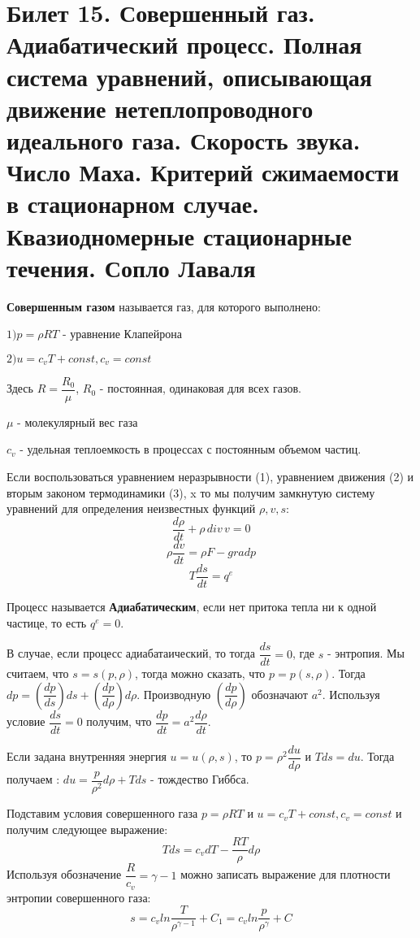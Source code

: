 \newpage
\section{Билет 15. Совершенный газ. Адиабатический процесс. Полная система уравнений, описывающая движение нетеплопроводного идеального газа. Скорость звука. Число Маха. Критерий сжимаемости в стационарном случае. Квазиодномерные стационарные течения. Сопло Лаваля}
	

\textbf{Совершенным газом} называется газ, для которого выполнено:

$1) p = \rho R T$ - уравнение Клапейрона

$2) u = c_v T + const, c_v = const$

Здесь $R = \dfrac{R_0}{\mu}$, $R_0$ - постоянная, одинаковая для всех газов.

$\mu$ - молекулярный вес газа

$c_v$ - удельная теплоемкость в процессах с постоянным объемом частиц.

Если воспользоваться уравнением неразрывности (1), уравнением движения (2) и вторым законом термодинамики (3), 
x   то мы получим замкнутую систему уравнений для определения неизвестных функций $\rho, v, s$:
$$\dfrac{d \rho}{d t} + \rho \,div\, v = 0 $$
  $$  \rho \dfrac{d v}{d t} = \rho F - grad p $$
   $$ T \dfrac{d s}{d t} = q^{e}$$

Процесс называется \textbf{Адиабатическим}, если нет притока тепла ни к одной частице, то есть $q^{e} = 0$.

В случае, если процесс адиабатаический, то тогда $\dfrac{d s}{d t} = 0$, где $s$ - энтропия. Мы считаем, что $s = s(p,\rho)$, тогда можно сказать, что $p = p (s, \rho)$. Тогда $d p = \left(\dfrac{d p}{d s}\right)d s + \left(\dfrac{d p}{d \rho}\right) d \rho$. Производную $\left(\dfrac{d p}{d \rho}\right)$ обозначают $a^2$. Используя условие $\dfrac{d s}{d t} = 0$ получим, что $\dfrac{d p}{d t} = a^2 \dfrac{d \rho}{d t}$.

Если задана внутренняя энергия $u = u (\rho, s)$, то $p = \rho^2 \dfrac{d u}{d \rho}$ и $T d s = d u$. Тогда получаем : $d u = \dfrac{p}{\rho^2}d \rho + T d s$ - тождество Гиббса.

Подставим условия совершенного газа $ p = \rho R T$ и $u = c_v T + const, c_v = const$ и получим следующее выражение:
$$T d s = c_v d T - \dfrac{R T}{\rho}d \rho$$
Используя обозначение $\dfrac{R}{c_v} = \gamma - 1$ можно записать выражение для плотности энтропии совершенного газа: 
$$s = c_vln\dfrac{T}{\rho^{\gamma-1}} + C_1 = c_v ln\dfrac{p}{\rho^\gamma} + C$$

